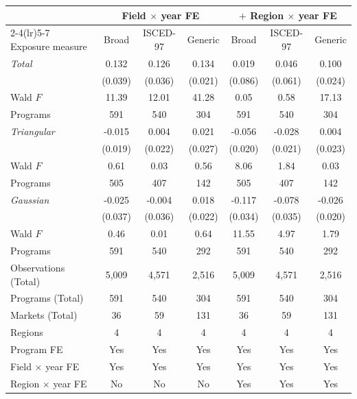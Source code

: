 \begin{tabular}{lcccccc}
\toprule
 & \multicolumn{3}{c}{Field \(\times\) year FE} & \multicolumn{3}{c}{\(+\) Region \(\times\) year FE} \\
\cmidrule(lr){2-4}\cmidrule(lr){5-7}
Exposure measure & Broad & ISCED-97 & Generic & Broad & ISCED-97 & Generic \\
\midrule
\textit{Total} &  0.132\sym{***} &  0.126\sym{***} &  0.134\sym{***} &  0.019 &  0.046 &  0.100\sym{***} \\
 & (0.039) & (0.036) & (0.021) & (0.086) & (0.061) & (0.024) \\
\quad Wald \(F\) & 11.39 & 12.01 & 41.28 &  0.05 &  0.58 & 17.13 \\
\quad Programs &       591 &       540 &       304 &       591 &       540 &       304 \\
\addlinespace
\textit{Triangular} & -0.015 &  0.004 &  0.021 & -0.056\sym{***} & -0.028 &  0.004 \\
 & (0.019) & (0.022) & (0.027) & (0.020) & (0.021) & (0.023) \\
\quad Wald \(F\) &  0.61 &  0.03 &  0.56 &  8.06 &  1.84 &  0.03 \\
\quad Programs &       505 &       407 &       142 &       505 &       407 &       142 \\
\addlinespace
\textit{Gaussian} & -0.025 & -0.004 &  0.018 & -0.117\sym{***} & -0.078\sym{**} & -0.026 \\
 & (0.037) & (0.036) & (0.022) & (0.034) & (0.035) & (0.020) \\
\quad Wald \(F\) &  0.46 &  0.01 &  0.64 & 11.55 &  4.97 &  1.79 \\
\quad Programs &       591 &       540 &       292 &       591 &       540 &       292 \\
\midrule
Observations (Total) &     5,009 &     4,571 &     2,516 &     5,009 &     4,571 &     2,516 \\
Programs (Total) &       591 &       540 &       304 &       591 &       540 &       304 \\
Markets (Total) &        36 &        59 &       131 &        36 &        59 &       131 \\
Regions &         4 &         4 &         4 &         4 &         4 &         4 \\
Program FE & Yes & Yes & Yes & Yes & Yes & Yes \\
Field \(\times\) year FE & Yes & Yes & Yes & Yes & Yes & Yes \\
Region \(\times\) year FE & No & No & No & Yes & Yes & Yes \\
\bottomrule
\end{tabular}
